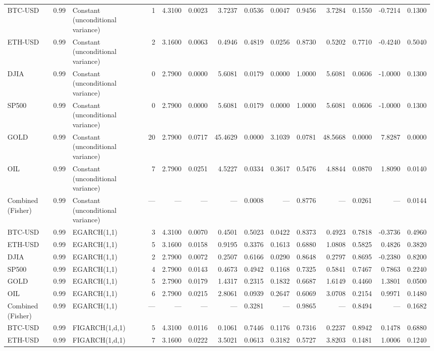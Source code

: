 \begin{table}[ht]
\begin{tabular}{lllrrrrrrrrrrr}
BTC-USD & 0.99 & Constant (unconditional variance) & 1 & 4.3100 & 0.0023 & 3.7237 & 0.0536 & 0.0047 & 0.9456 & 3.7284 & 0.1550 & -0.7214 & 0.1300 \\
ETH-USD & 0.99 & Constant (unconditional variance) & 2 & 3.1600 & 0.0063 & 0.4946 & 0.4819 & 0.0256 & 0.8730 & 0.5202 & 0.7710 & -0.4240 & 0.5040 \\
DJIA & 0.99 & Constant (unconditional variance) & 0 & 2.7900 & 0.0000 & 5.6081 & 0.0179 & 0.0000 & 1.0000 & 5.6081 & 0.0606 & -1.0000 & 0.1300 \\
SP500 & 0.99 & Constant (unconditional variance) & 0 & 2.7900 & 0.0000 & 5.6081 & 0.0179 & 0.0000 & 1.0000 & 5.6081 & 0.0606 & -1.0000 & 0.1300 \\
GOLD & 0.99 & Constant (unconditional variance) & 20 & 2.7900 & 0.0717 & 45.4629 & 0.0000 & 3.1039 & 0.0781 & 48.5668 & 0.0000 & 7.8287 & 0.0000 \\
OIL & 0.99 & Constant (unconditional variance) & 7 & 2.7900 & 0.0251 & 4.5227 & 0.0334 & 0.3617 & 0.5476 & 4.8844 & 0.0870 & 1.8090 & 0.0140 \\
Combined (Fisher) & 0.99 & Constant (unconditional variance) & — & — & — & — & 0.0008 & — & 0.8776 & — & 0.0261 & — & 0.0144 \\
BTC-USD & 0.99 & EGARCH(1,1) & 3 & 4.3100 & 0.0070 & 0.4501 & 0.5023 & 0.0422 & 0.8373 & 0.4923 & 0.7818 & -0.3736 & 0.4960 \\
ETH-USD & 0.99 & EGARCH(1,1) & 5 & 3.1600 & 0.0158 & 0.9195 & 0.3376 & 0.1613 & 0.6880 & 1.0808 & 0.5825 & 0.4826 & 0.3820 \\
DJIA & 0.99 & EGARCH(1,1) & 2 & 2.7900 & 0.0072 & 0.2507 & 0.6166 & 0.0290 & 0.8648 & 0.2797 & 0.8695 & -0.2380 & 0.8200 \\
SP500 & 0.99 & EGARCH(1,1) & 4 & 2.7900 & 0.0143 & 0.4673 & 0.4942 & 0.1168 & 0.7325 & 0.5841 & 0.7467 & 0.7863 & 0.2240 \\
GOLD & 0.99 & EGARCH(1,1) & 5 & 2.7900 & 0.0179 & 1.4317 & 0.2315 & 0.1832 & 0.6687 & 1.6149 & 0.4460 & 1.3801 & 0.0500 \\
OIL & 0.99 & EGARCH(1,1) & 6 & 2.7900 & 0.0215 & 2.8061 & 0.0939 & 0.2647 & 0.6069 & 3.0708 & 0.2154 & 0.9971 & 0.1480 \\
Combined (Fisher) & 0.99 & EGARCH(1,1) & — & — & — & — & 0.3281 & — & 0.9865 & — & 0.8494 & — & 0.1682 \\
BTC-USD & 0.99 & FIGARCH(1,d,1) & 5 & 4.3100 & 0.0116 & 0.1061 & 0.7446 & 0.1176 & 0.7316 & 0.2237 & 0.8942 & 0.1478 & 0.6880 \\
ETH-USD & 0.99 & FIGARCH(1,d,1) & 7 & 3.1600 & 0.0222 & 3.5021 & 0.0613 & 0.3182 & 0.5727 & 3.8203 & 0.1481 & 1.0006 & 0.1240 \\

\end{tabular}
\end{table}
